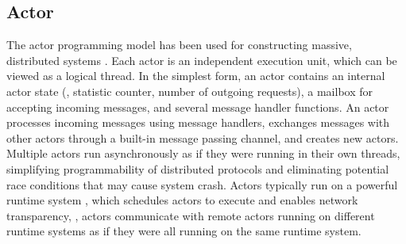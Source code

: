 





\subsection{Actor}

The actor programming model has been used for constructing massive, distributed systems \cite{actor-wiki, akka, newell2016optimizing, AnalysisActor}. Each actor is an independent execution unit, which can be viewed as a logical thread. In the simplest form, an actor contains an internal actor state (\eg, statistic counter, number of outgoing requests), a mailbox for accepting incoming messages, and several message handler functions. An actor processes incoming messages using message handlers, exchanges messages with other actors through a built-in message passing channel, and creates new actors. %
Multiple actors run asynchronously %
 as if they were running in their own threads, simplifying programmability of distributed protocols and eliminating potential race conditions that may cause system crash.
Actors typically run on a powerful runtime system \cite{erlang, akka, caf}, which schedules actors to execute and enables network transparency, \ie, actors communicate with remote actors running on different runtime systems as if they were all running on the same runtime system.


